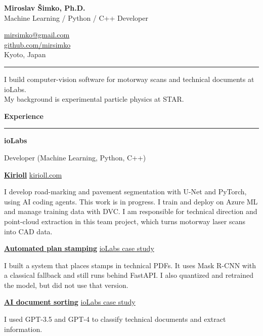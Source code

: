 \documentclass[a4paper,10pt,oneside]{article}
\newlength\cvhang
\newlength\cvfull
\newcommand\cvmeta{\sffamily\fontsize{8.8}{14.6}\selectfont\color{meta}}
\newcommand\cvkey[1]{\leavevmode\llap{\makebox[\cvhang][l]{\cvmeta #1}}\ignorespaces}
\newcommand\cvsection[1]{\par\addvspace{20pt}\noindent\hspace*{-\cvhang}%
  {\sffamily\bfseries\fontsize{9}{11}\selectfont\color{accent}#1}%
  \enspace\textcolor{hair}{\leaders\hrule height 2.9pt depth -2.5pt\hfill}\par
  \nopagebreak\vspace{9pt}}
\newcommand\cventry[3]{\par\addvspace{10pt}\cvkey{#1}%
  {\sffamily\bfseries\fontsize{10.6}{14.6}\selectfont #2}%
  \if\relax\detokenize{#3}\relax\else
    \hspace{.6em}{\sffamily\fontsize{10.2}{14.6}\selectfont\color{meta}#3}\fi
  \par\nopagebreak\vspace{2pt}}
\newcommand\cvproject[3]{\par\addvspace{8pt}%
  \href{#2}{{\sffamily\bfseries\fontsize{10}{14.6}\selectfont\color{ink}#1}}%
  \hfill\href{#2}{{\sffamily\fontsize{8.5}{14.6}\selectfont #3}}\par\nopagebreak}
\begin{document}
\noindent\hspace*{-\cvhang}\begin{minipage}[b]{.62\cvfull}
  {\sffamily\bfseries\fontsize{25}{29}\selectfont Miroslav Šimko, Ph.D.}\\[5pt]
  {\sffamily\fontsize{11.5}{15}\selectfont\color{accent}Machine Learning / Python / C++ Developer}
\end{minipage}\hfill
\begin{minipage}[b]{.35\cvfull}\raggedleft\sffamily\fontsize{9.4}{13.6}\selectfont
  \href{mailto:mirsimko@gmail.com}{mirsimko@gmail.com}\\
  \href{https://github.com/mirsimko}{github.com/mirsimko}\\
  {\color{meta}Kyoto, Japan}
\end{minipage}\par
\vspace{10pt}\noindent\hspace*{-\cvhang}\textcolor{accent}{\rule{\cvfull}{.9pt}}\par
\vspace{15pt}\noindent\hspace*{-\cvhang}\parbox[t]{\cvfull}{\fontsize{11.3}{16.4}\selectfont\raggedright
  I build computer-vision software for motorway scans and technical documents at ioLabs.\\
  My background is experimental particle physics at STAR.}\par

\cvsection{Experience}
\cventry{2021--present}{ioLabs}{}
{\sffamily\color{meta}Developer (Machine Learning, Python, C++)}\par
\cvproject{Kirioll}{https://kirioll.com/}{kirioll.com}
I develop road-marking and pavement segmentation with \mbox{U-Net} and PyTorch,
using AI coding agents. This work is in progress. I train and deploy on Azure ML
and manage training data with DVC. I am responsible for technical direction and
point-cloud extraction in this team project, which turns motorway laser scans into CAD data.

\cvproject{Automated plan stamping}{https://iolabs.ch/en/case-studies/automated-plan-stamping/}{ioLabs case study}
I built a system that places stamps in technical PDFs. It uses Mask R-CNN with a
classical fallback and still runs behind FastAPI. I also quantized and retrained
the model, but did not use that version.

\cvproject{AI document sorting}{https://iolabs.ch/en/case-studies/ai-data-sorting/}{ioLabs case study}
I used GPT-3.5 and GPT-4 to classify technical documents and extract information.
\end{document}
